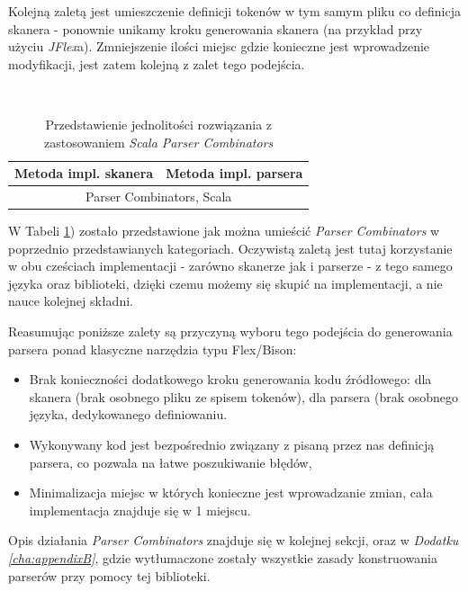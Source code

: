 \documentclass[pdflatex,11pt]{aghdpl}
\begin{document}
Kolejną zaletą jest umieszczenie definicji tokenów w tym samym pliku co definicja skanera - ponownie unikamy kroku generowania 
skanera (na przykład przy użyciu \textit{JFlex}a). Zmniejszenie ilości miejsc gdzie konieczne jest wprowadzenie modyfikacji, jest zatem kolejną z zalet
tego podejścia.

~\\\*

\begin{table}[ch]
  \begin{center}
    \begin{tabular}{| l | l |}
      \hline
      Metoda impl. skanera & Metoda impl. parsera\\
      \hline
      \multicolumn{2}{|c|}{Parser Combinators, Scala} \\
      \hline
    \end{tabular}
  \end{center}
  \caption{Przedstawienie jednolitości rozwiązania z zastosowaniem \textit{Scala Parser Combinators}}
  \label{tab:scala_parsers_table}
\end{table}

W Tabeli \ref{tab:scala_parsers_table}) zostało przedstawione jak można umieścić \textit{Parser Combinators} 
w poprzednio przedstawianych kategoriach. Oczywistą zaletą jest tutaj korzystanie w obu cześciach implementacji 
- zarówno skanerze jak i parserze - z tego samego języka oraz biblioteki, dzięki czemu możemy się skupić na implementacji,
a nie nauce kolejnej składni.

Reasumując poniższe zalety są przyczyną wyboru tego podejścia do generowania parsera ponad klasyczne narzędzia typu Flex/Bison:
\begin{itemize}
 \item Brak konieczności dodatkowego kroku generowania kodu źródłowego: 
  \subitem dla skanera (brak osobnego pliku ze spisem tokenów), 
  \subitem dla parsera (brak osobnego języka, dedykowanego definiowaniu.
 \item Wykonywany kod jest bezpośrednio związany z pisaną przez nas definicją parsera, co pozwala na łatwe poszukiwanie błędów,
 \item Minimalizacja miejsc w których konieczne jest wprowadzanie zmian, cała implementacja znajduje się w 1 miejscu.
\end{itemize}

Opis działania \textit{Parser Combinators} znajduje się w kolejnej sekcji, oraz w \textit{Dodatku \ref{cha:appendixB}}, gdzie wytłumaczone zostały wszystkie zasady
konstruowania parserów przy pomocy tej biblioteki.
\end{document}
